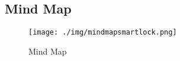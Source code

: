 \subsection{Mind Map}

\begin{figure}[!ht]
    \centering
    \texttt{[image: ./img/mindmapsmartlock.png]}
    \caption{Mind Map}
    \label{fig:enter-label}
\end{figure}

